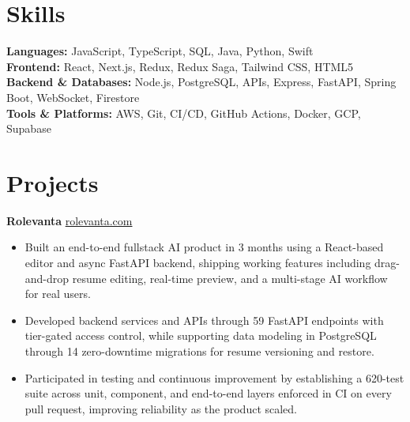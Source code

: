 \documentclass[11pt]{article}       %
\begin{document}
\vspace{-10.5pt}

\section*{Skills}
\textbf{Languages:} JavaScript, TypeScript, SQL, Java, Python, Swift \\
\textbf{Frontend:} React, Next.js, Redux, Redux Saga, Tailwind CSS, HTML5 \\
\textbf{Backend \& Databases:} Node.js, PostgreSQL, APIs, Express, FastAPI, Spring Boot, WebSocket, Firestore \\
\textbf{Tools \& Platforms:} AWS, Git, CI/CD, GitHub Actions, Docker, GCP, Supabase
\vspace{-5pt}






\section*{Projects}
\textbf{Rolevanta} \hfill \href{https://rolevanta.com}{rolevanta.com} \\
\vspace{-9pt}
\begin{itemize}
  \item Built an end-to-end fullstack AI product in 3 months using a React-based editor and async FastAPI backend, shipping working features including drag-and-drop resume editing, real-time preview, and a multi-stage AI workflow for real users.
  \item Developed backend services and APIs through 59 FastAPI endpoints with tier-gated access control, while supporting data modeling in PostgreSQL through 14 zero-downtime migrations for resume versioning and restore.
  \item Participated in testing and continuous improvement by establishing a 620-test suite across unit, component, and end-to-end layers enforced in CI on every pull request, improving reliability as the product scaled.
\end{itemize}
\end{document}
